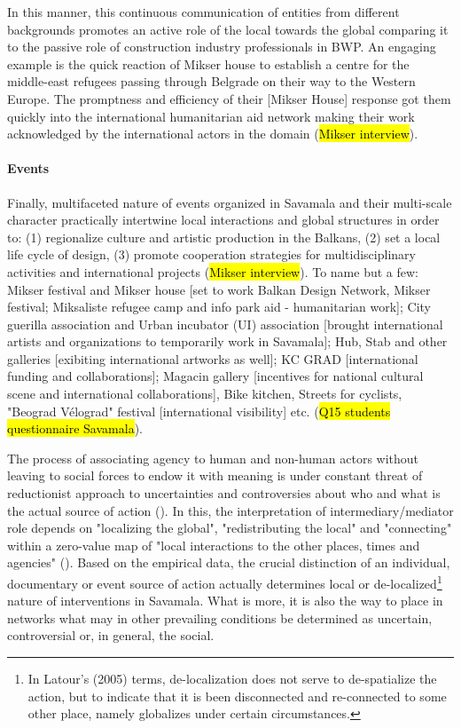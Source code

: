\documentclass[11pt]{report}
\begin{document}
In this manner, this continuous communication of entities from different backgrounds promotes an active role of the local towards the global comparing it to the passive role of construction industry professionals in BWP.
An engaging example is the quick reaction of Mikser house to establish a centre for the middle-east refugees passing through Belgrade on their way to the Western Europe.
The promptness and efficiency of their [Mikser House] response got them quickly into the international humanitarian aid network making their work acknowledged by the international actors in the domain
(\hl{Mikser interview}).

\paragraph{Events}

Finally, multifaceted nature of events organized in Savamala and their multi-scale character practically intertwine local interactions and global structures in order to:
(1) regionalize culture and artistic production in the Balkans,
(2) set a local life cycle of design,
(3) promote cooperation strategies for multidisciplinary activities and international projects (\hl{Mikser interview}).
To name but a few:
Mikser festival and Mikser house [set to work Balkan Design Network, Mikser festival; 
Miksaliste refugee camp and info park aid - humanitarian work];
City guerilla association and Urban incubator (UI) association [brought international artists and organizations to temporarily work in Savamala];
Hub, Stab and other galleries [exibiting international artworks as well];
KC GRAD [international funding and collaborations];
Magacin gallery [incentives for national cultural scene and international collaborations],
Bike kitchen, Streets for cyclists, "Beograd Vélograd" festival [international visibility]
etc.
(\hl{Q15 students questionnaire Savamala}).

The process of associating agency to human and non-human actors without leaving to social forces to endow it with meaning is under constant threat of reductionist approach to uncertainties and controversies about who and what is the actual source of action (\cite{Latour 2005}).
In this, the interpretation of intermediary/mediator role depends on "localizing the global", "redistributing the local" and "connecting" within a zero-value map of "local interactions to the other places, times and agencies" (\cite{Latour 2005}).
Based on the empirical data, the crucial distinction of an individual, documentary or event source of action actually determines local or de-localized\footnote{In Latour's (2005) terms, de-localization does not serve to de-spatialize the action, but to indicate that it is been disconnected and re-connected to some other place, namely globalizes under certain circumstances.}
nature of interventions in Savamala.
What is more, it is also the way to place in networks what may in other prevailing conditions be determined as uncertain, controversial or, in general, the social.
\end{document}
